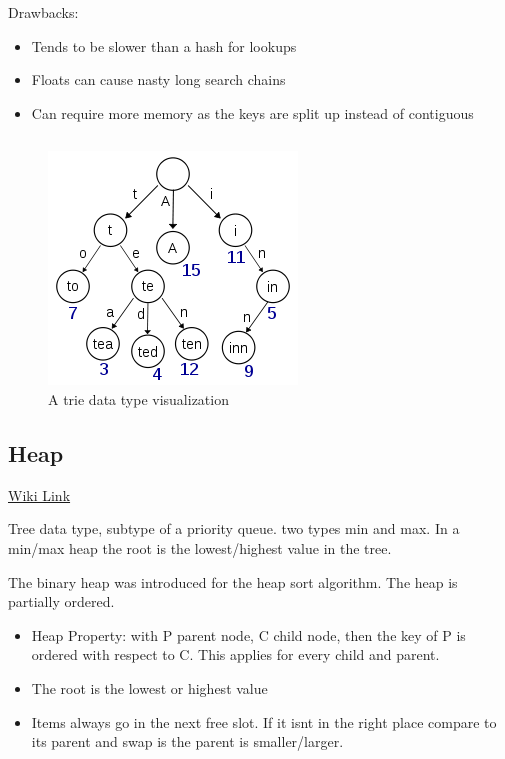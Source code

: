 Drawbacks:
\begin{itemize}
	\item Tends to be slower than a hash for lookups
	\item Floats can cause nasty long search chains
	\item Can require more memory as the keys are split up instead of contiguous
\end{itemize}

\begin{table}
	\begin{tabular}{r p{}}
		
	\end{tabular}
\end{table}

\begin{figure}
	\centering
	\includegraphics[width=.5\textwidth]{trie.png}
	\caption{A trie data type visualization}
\end{figure}



\subsection{Heap}

\href{https://en.wikipedia.org/wiki/Heap_%28data_structure%29}{Wiki Link}

	Tree data type, subtype of a priority queue. two types \ra min and max. In a min/max heap the root is the lowest/highest value in the tree.

	The binary heap was introduced for the heap sort algorithm. The heap is partially ordered.

	\begin{itemize}
		\item Heap Property: with P \ra parent node, C \ra child node, then the key of P is ordered with respect to C. This applies for every child and parent.
		\item The root is the lowest or highest value
		\item Items always go in the next free slot. If it isnt in the right place compare to its parent and swap is the parent is smaller/larger.
	\end{itemize}


